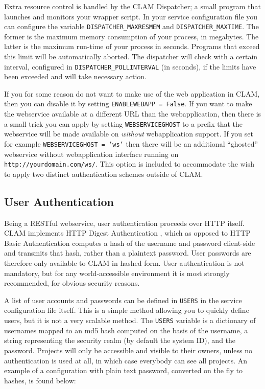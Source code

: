 \documentclass[a4paper,12pt]{report}
\begin{document}
Extra resource control is handled by the CLAM Dispatcher; a small program that
launches and monitors your wrapper script. In your service configuration file
you can configure the variable \texttt{DISPATCHER\_MAXRESMEM} and
\texttt{DISPATCHER\_MAXTIME}. The former is the maximum memory consumption of
your process, in megabytes. The latter is the maximum run-time of your process
in seconds. Programs that exceed this limit will be automatically aborted. The
dispatcher will check with a certain interval, configured in
\texttt{DISPATCHER\_POLLINTERVAL} (in seconds), if the limits have been
exceeded and will take necessary action.  
  

If you for some reason do not want to make use of the web application in CLAM,
then you can disable it by setting \texttt{ENABLEWEBAPP = False}. If you want
to make the webservice available at a different URL than the webapplication,
then there is a small trick you can apply by setting \texttt{WEBSERVICEGHOST}
to a prefix that the webservice will be made available on \emph{without}
webapplication support. If you set for example \texttt{WEBSERVICEGHOST = 'ws'}
then there will be an additional ``ghosted'' webservice without webapplication
interface running on \texttt{http://yourdomain.com/ws/}. This option is
included to accommodate the wish to apply two distinct authentication schemes
outside of CLAM. 


\subsection{User Authentication}

Being a RESTful webservice, user authentication proceeds over HTTP itself. CLAM
implements HTTP Digest Authentication \cite{HTTPAUTH}, which as opposed to HTTP Basic
Authentication computes a hash of the username and password client-side and
transmits that hash, rather than a plaintext password. User passwords are
therefore only available to CLAM in hashed form. User authentication is not
mandatory, but for any world-accessible environment it is most strongly
recommended, for obvious security reasons. 

A list of user accounts and passwords can be defined in \texttt{USERS} in the
service configuration file itself. This is a simple method allowing you to
quickly define users, but it is not a very scalable method. The \texttt{USERS}
variable is a dictionary of usernames mapped to an md5 hash computed on the
basis of the username, a string representing the security realm (by default the
system ID), and the password. Projects will only be accessible and visible to
their owners, unless no authentication is used at all, in which case everybody
can see all projects. An example of a configuration with plain text password,
converted on the fly to hashes, is found below:
\end{document}
